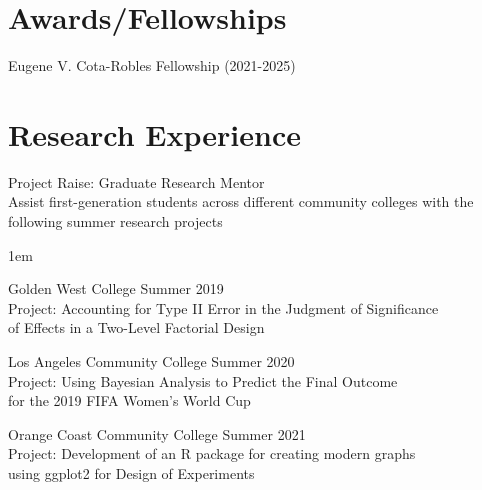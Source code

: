 \documentclass[margin,line]{res}
\newenvironment{list1}{
  \begin{list}{\ding{113}}{
      \setlength{\itemsep}{0in}
      \setlength{\parsep}{0in} \setlength{\parskip}{0in}
      \setlength{\topsep}{0in} \setlength{\partopsep}{0in} 
      \setlength{\leftmargin}{0.20in}}}{\end{list}}
\begin{document}
\begin{resume}
\vspace{2ex}

\section{\sc Awards/\newline Fellowships}
\begin{list1}
\item[] Eugene V. Cota-Robles Fellowship (2021-2025)
\end{list1}


\vspace{2ex}

\section{\sc Research Experience}


{\sc Project Raise: Graduate Research Mentor}\\[5pt]
Assist first-generation students across different community colleges with the
following summer research projects \\[4pt]
\begin{list1}
\itemsep1em
\item[] {\sc Golden West College} \hfill Summer 2019 \\[3pt]
Project: Accounting for Type II Error in the Judgment of Significance \\[3pt]
of Effects 
in a Two-Level Factorial Design
\item[] {\sc Los Angeles Community College} \hfill Summer 2020 \\[3pt]
Project: Using Bayesian Analysis to Predict the Final Outcome  \\[3pt]
for the 2019 
FIFA Women's World Cup
\newpage
\item[] {\sc Orange Coast Community College} \hfill Summer 2021 \\[3pt]
Project: Development of an R package for creating modern graphs \\[3pt]
using ggplot2 for 
Design of Experiments
\end{list1}




\end{resume}
\end{document}
